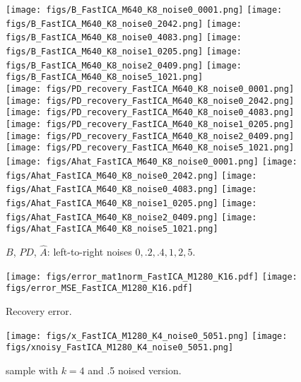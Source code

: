 \documentclass[journal, onecolumn]{IEEEtran}
\begin{document}


\begin{figure*}[t!]
\begin{center}
\texttt{[image: figs/B\_FastICA\_M640\_K8\_noise0\_0001.png]}
\texttt{[image: figs/B\_FastICA\_M640\_K8\_noise0\_2042.png]}
\texttt{[image: figs/B\_FastICA\_M640\_K8\_noise0\_4083.png]}
\texttt{[image: figs/B\_FastICA\_M640\_K8\_noise1\_0205.png]}
\texttt{[image: figs/B\_FastICA\_M640\_K8\_noise2\_0409.png]}
\texttt{[image: figs/B\_FastICA\_M640\_K8\_noise5\_1021.png]}\\
\texttt{[image: figs/PD\_recovery\_FastICA\_M640\_K8\_noise0\_0001.png]}
\texttt{[image: figs/PD\_recovery\_FastICA\_M640\_K8\_noise0\_2042.png]}
\texttt{[image: figs/PD\_recovery\_FastICA\_M640\_K8\_noise0\_4083.png]}
\texttt{[image: figs/PD\_recovery\_FastICA\_M640\_K8\_noise1\_0205.png]}
\texttt{[image: figs/PD\_recovery\_FastICA\_M640\_K8\_noise2\_0409.png]}
\texttt{[image: figs/PD\_recovery\_FastICA\_M640\_K8\_noise5\_1021.png]} \\
\texttt{[image: figs/Ahat\_FastICA\_M640\_K8\_noise0\_0001.png]}
\texttt{[image: figs/Ahat\_FastICA\_M640\_K8\_noise0\_2042.png]}
\texttt{[image: figs/Ahat\_FastICA\_M640\_K8\_noise0\_4083.png]}
\texttt{[image: figs/Ahat\_FastICA\_M640\_K8\_noise1\_0205.png]}
\texttt{[image: figs/Ahat\_FastICA\_M640\_K8\_noise2\_0409.png]}
\texttt{[image: figs/Ahat\_FastICA\_M640\_K8\_noise5\_1021.png]}
\caption{$B$, $PD$, $\hat{A}$: left-to-right noises $0, .2, .4, 1, 2, 5$.}
\end{center}
\end{figure*}

\begin{figure*}[t!]
\begin{center}
\texttt{[image: figs/error\_mat1norm\_FastICA\_M1280\_K16.pdf]}
\texttt{[image: figs/error\_MSE\_FastICA\_M1280\_K16.pdf]}
\caption{Recovery error.}
\end{center}
\end{figure*}


\begin{figure*}[t!]
\begin{center}
\texttt{[image: figs/x\_FastICA\_M1280\_K4\_noise0\_5051.png]}
\texttt{[image: figs/xnoisy\_FastICA\_M1280\_K4\_noise0\_5051.png]}
\caption{sample with $k=4$ and .5 noised version.}
\end{center}
\end{figure*}
\end{document}
